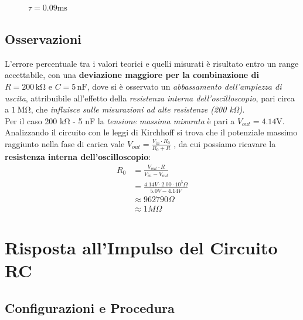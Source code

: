 \documentclass[a4paper,10pt]{article}
\begin{document}
\begin{figure}[htbp]
\begin{minipage}{0.32\textwidth}
        \caption{\(\tau = 0.09 \si{\milli\second}\)}
    \end{minipage}
\end{figure}


\subsection{Osservazioni}

L'errore percentuale tra i valori teorici e quelli misurati è risultato entro un range accettabile, con una \textbf{deviazione maggiore per la combinazione di} \( R = 200 \, \mathrm{k\Omega} \) e \( C = 5 \, \mathrm{nF} \), dove si è osservato un \textit{abbassamento dell'ampiezza di uscita}, attribuibile all'effetto della \textit{resistenza interna dell'oscilloscopio}, pari circa a \(\SI{1}{\mega\ohm}\), che \textit{influisce sulle misurazioni ad alte resistenze (200 \si{\kilo\ohm})}. \\
Per il caso 200 \si{\kilo\ohm} - 5 \si{\nano\farad} la \textit{tensione massima misurata} è pari a \(V_{out}=4.14 \si{\volt}\).
Analizzando il circuito con le leggi di Kirchhoff si trova che il potenziale massimo raggiunto nella fase di carica vale \(V_{out} = \frac{V_{in} \cdot R_0}{R_0 + R}\) , da cui possiamo ricavare la \textbf{resistenza interna dell'oscilloscopio}:
\[
    \begin{aligned}
        R_0 
        &= \frac{V_{out} \cdot R}{V_{in} - V_{out}} \\
        &= \frac{4.14 V \cdot 2.00 \cdot 10^5 \Omega}{5.0 V - 4.14 V}    \\
        &\approx 962790 \Omega\\
        & \approx 1 M \Omega
    \end{aligned}
\]




\section{Risposta all'Impulso del Circuito RC} \label{sec:risposta_impulso}

\subsection{Configurazioni e Procedura}
\end{document}
